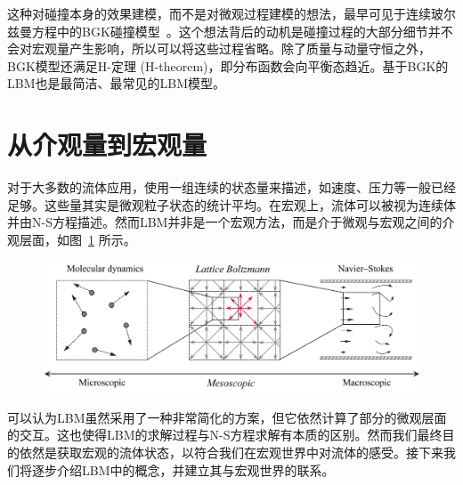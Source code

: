 这种对碰撞本身的效果建模，而不是对微观过程建模的想法，最早可见于连续玻尔兹曼方程中的BGK碰撞模型~\cite{Bhatnagar-1954}。这个想法背后的动机是碰撞过程的大部分细节并不会对宏观量产生影响，所以可以将这些过程省略。除了质量与动量守恒之外，BGK模型还满足$\mathrm{H}$-定理 (H-theorem)，即分布函数会向平衡态趋近。基于BGK的LBM也是最简洁、最常见的LBM模型。


\section{从介观量到宏观量}
\label{sec:moment}
对于大多数的流体应用，使用一组连续的状态量来描述，如速度、压力等一般已经足够。这些量其实是微观粒子状态的统计平均。在宏观上，流体可以被视为连续体并由N-S方程描述。然而LBM并非是一个宏观方法，而是介于微观与宏观之间的介观层面，如图~\ref{img:fluid_abstraction} 所示。

\begin{figure}[htb]
    \centering
      \includegraphics[width=0.99\columnwidth]{figures/fluid_abstraction.png}
    \label{img:fluid_abstraction}
\end{figure}

可以认为LBM虽然采用了一种非常简化的方案，但它依然计算了部分的微观层面的交互。这也使得LBM的求解过程与N-S方程求解有本质的区别。然而我们最终目的依然是获取宏观的流体状态，以符合我们在宏观世界中对流体的感受。接下来我们将逐步介绍LBM中的概念，并建立其与宏观世界的联系。

